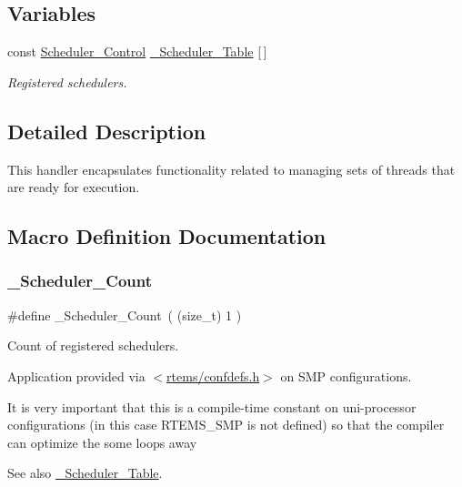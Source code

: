 \subsection*{Variables}
\begin{DoxyCompactItemize}
\item 
const \mbox{\hyperlink{struct__Scheduler__Control}{Scheduler\+\_\+\+Control}} \mbox{\hyperlink{group__RTEMSScoreScheduler_ga5810660559bc51e3083fe09f9b70878c}{\+\_\+\+Scheduler\+\_\+\+Table}} \mbox{[}$\,$\mbox{]}
\begin{DoxyCompactList}\small\item\em Registered schedulers. \end{DoxyCompactList}\end{DoxyCompactItemize}


\subsection{Detailed Description}
This handler encapsulates functionality related to managing sets of threads that are ready for execution. 

\subsection{Macro Definition Documentation}
\mbox{\label{group__RTEMSScoreScheduler_ga31e91c7ee7890178b2292e5ecb7d75a7}} 
\subsubsection{\texorpdfstring{\_Scheduler\_Count}{\_Scheduler\_Count}}
{\footnotesize\ttfamily \#define \+\_\+\+Scheduler\+\_\+\+Count~( (size\+\_\+t) 1 )}



Count of registered schedulers. 

Application provided via $<$\mbox{\hyperlink{confdefs_8h}{rtems/confdefs.\+h}}$>$ on S\+MP configurations.

It is very important that this is a compile-\/time constant on uni-\/processor configurations (in this case R\+T\+E\+M\+S\+\_\+\+S\+MP is not defined) so that the compiler can optimize the some loops away

\begin{DoxySeeAlso}{See also}
\mbox{\hyperlink{group__RTEMSScoreScheduler_ga5810660559bc51e3083fe09f9b70878c}{\+\_\+\+Scheduler\+\_\+\+Table}}. 
\end{DoxySeeAlso}


